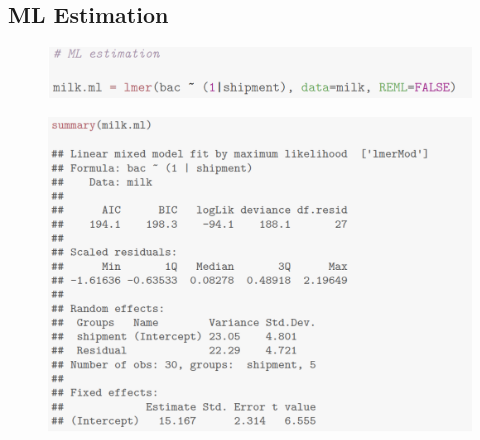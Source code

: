 \documentclass[11pt,a4paper]{article}
\begin{document}
\subsection{ML Estimation}
\begin{center}\begin{figure}[htb]
    \centering
    \includegraphics[scale=0.5]{ML Est1}
    \caption{}
    \label{}
\end{figure}\end{center}
\begin{center}\begin{figure}[htb]
    \centering
    \includegraphics[scale=0.5]{ML Est2}
    \caption{}
    \label{}
\end{figure}\end{center}
\end{document}
